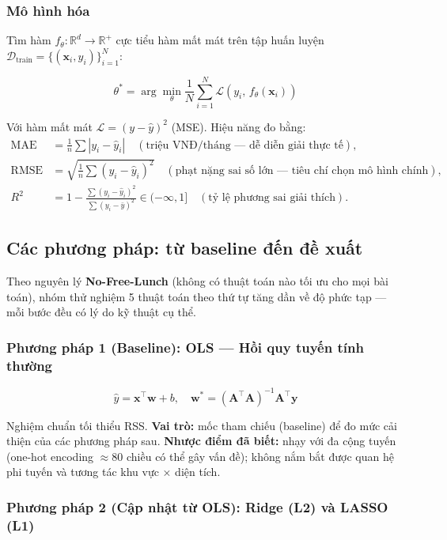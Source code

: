 \subsubsection*{Mô hình hóa}

Tìm hàm $f_\theta: \mathbb{R}^d \to \mathbb{R}^+$ cực tiểu hàm mất mát trên tập huấn luyện
$\mathcal{D}_\text{train} = \{(\mathbf{x}_i, y_i)\}_{i=1}^{N}$:

\[
  \theta^* = \arg\min_\theta \frac{1}{N}\sum_{i=1}^{N} \mathcal{L}(y_i,\, f_\theta(\mathbf{x}_i))
\]

Với hàm mất mát $\mathcal{L} = (y - \hat{y})^2$ (MSE).
Hiệu năng đo bằng:
\begin{align*}
  \text{MAE} &= \frac{1}{n}\sum|y_i - \hat{y}_i|
  \quad(\text{triệu VNĐ/tháng — dễ diễn giải thực tế}), \\
  \text{RMSE} &= \sqrt{\frac{1}{n}\sum(y_i - \hat{y}_i)^2}
  \quad(\text{phạt nặng sai số lớn — tiêu chí chọn mô hình chính}), \\
  R^2 &= 1 - \frac{\sum(y_i-\hat{y}_i)^2}{\sum(y_i-\bar{y})^2}
  \in (-\infty, 1]
  \quad(\text{tỷ lệ phương sai giải thích}).
\end{align*}

\subsection{Các phương pháp: từ baseline đến đề xuất}
\label{subsec:models}

Theo nguyên lý \textbf{No-Free-Lunch} (không có thuật toán nào tối ưu
cho mọi bài toán), nhóm thử nghiệm 5 thuật toán theo thứ tự tăng dần
về độ phức tạp — mỗi bước đều có lý do kỹ thuật cụ thể.

\subsubsection*{Phương pháp 1 (Baseline): OLS — Hồi quy tuyến tính thường}

\[
  \hat{y} = \mathbf{x}^\top\mathbf{w} + b,
  \quad \mathbf{w}^* = (\mathbf{A}^\top\mathbf{A})^{-1}\mathbf{A}^\top\mathbf{y}
\]

Nghiệm chuẩn tối thiểu RSS.
\textbf{Vai trò:} mốc tham chiếu (baseline) để đo mức cải thiện của các phương pháp sau.
\textbf{Nhược điểm đã biết:} nhạy với đa cộng tuyến (one-hot encoding $\approx$80 chiều có thể gây vấn đề);
không nắm bắt được quan hệ phi tuyến và tương tác khu vực × diện tích.

\subsubsection*{Phương pháp 2 (Cập nhật từ OLS): Ridge (L2) và LASSO (L1)}

